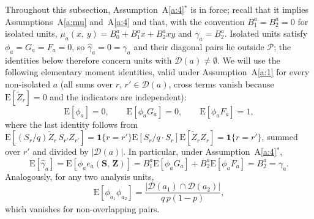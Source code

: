 \documentclass[sigconf,nonacm]{acmart}
\newcommand{\E}{\mathrm E}
\begin{document}
Throughout this subsection, Assumption~A\ref{a:4}$^*$ is in force; recall that it implies Assumptions~A\ref{a:mu} and~A\ref{a:4} and that, with the convention $B_1^a=B_2^a=0$ for isolated units, $\mu_a(x,\,y) = B_0^a+B_1^ax+B_2^axy$ and $\gamma_a = B_2^a$. Isolated units satisfy $\phi_a=G_a=F_a=0$, so $\hat\gamma_a = 0 = \gamma_a$ and their diagonal pairs lie outside $\mathcal P$; the identities below therefore concern units with $\mathcal D(a)\neq\emptyset$. We will use the following elementary moment identities, valid under Assumption~A\ref{a:1} for every non-isolated $a$ (all sums over $r,\,r'\in\mathcal D(a)$, cross terms vanish because $\E[\tilde Z_r]=0$ and the indicators are independent):
\begin{equation}\label{eq:phi-moments}
    \E[\phi_a] = 0,\qquad \E[\phi_a G_a] = 0,\qquad \E[\phi_a F_a] = 1,
\end{equation}
where the last identity follows from
$\E[(S_r/q)\tilde Z_r\,S_{r'}Z_{r'}] = \mathbf 1\{r=r'\}\E[S_r/q\cdot S_r]\E[\tilde Z_rZ_r] = \mathbf 1\{r=r'\}$, summed over $r'$ and divided by $|\mathcal D(a)|$. In particular, under Assumption~A\ref{a:4}$^*$,
\begin{equation}\label{eq:gamma-unbiased-astar}
    \E[\hat\gamma_a] = \E[\phi_a e_a(\mathbf S,\,\mathbf Z)] = B_1^a\E[\phi_aG_a] + B_2^a\E[\phi_aF_a] = B_2^a = \gamma_a.
\end{equation}
Analogously, for any two analysis units,
\begin{equation}\label{eq:A12}
    \E[\phi_{a_1}\phi_{a_2}] = \frac{|\mathcal D(a_1)\cap\mathcal D(a_2)|}{q\,p(1-p)},
\end{equation}
which vanishes for non-overlapping pairs.
\end{document}
